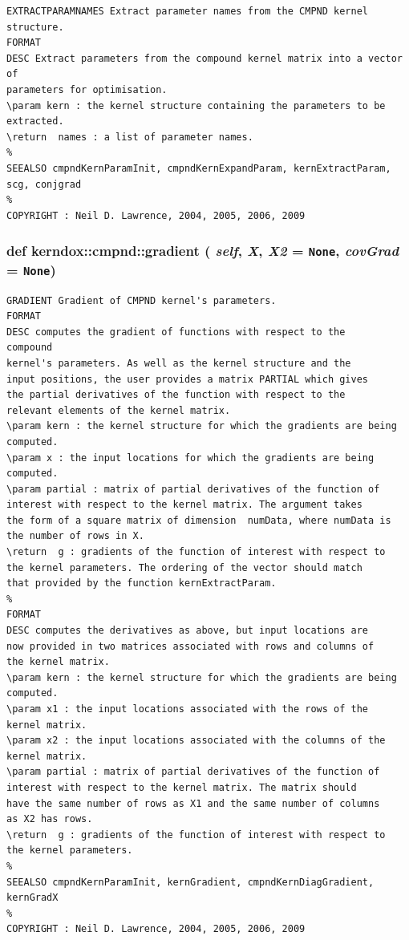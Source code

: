 \footnotesize\begin{verbatim}EXTRACTPARAMNAMES Extract parameter names from the CMPND kernel structure.
FORMAT
DESC Extract parameters from the compound kernel matrix into a vector of
parameters for optimisation.
\param kern : the kernel structure containing the parameters to be
extracted.
\return  names : a list of parameter names.
%
SEEALSO cmpndKernParamInit, cmpndKernExpandParam, kernExtractParam, scg, conjgrad
%
COPYRIGHT : Neil D. Lawrence, 2004, 2005, 2006, 2009

\end{verbatim}
\normalsize
 \hypertarget{classkerndox_1_1cmpnd_029858b6168a89349a61d417ffe99fbd}{
\subsubsection[{gradient}]{\setlength{\rightskip}{0pt plus 5cm}def kerndox::cmpnd::gradient ( {\em self}, \/   {\em X}, \/   {\em X2} = {\tt None}, \/   {\em covGrad} = {\tt None})}}
\label{classkerndox_1_1cmpnd_029858b6168a89349a61d417ffe99fbd}




\footnotesize\begin{verbatim}GRADIENT Gradient of CMPND kernel's parameters.
FORMAT
DESC computes the gradient of functions with respect to the
compound
kernel's parameters. As well as the kernel structure and the
input positions, the user provides a matrix PARTIAL which gives
the partial derivatives of the function with respect to the
relevant elements of the kernel matrix. 
\param kern : the kernel structure for which the gradients are being
computed.
\param x : the input locations for which the gradients are being
computed. 
\param partial : matrix of partial derivatives of the function of
interest with respect to the kernel matrix. The argument takes
the form of a square matrix of dimension  numData, where numData is
the number of rows in X.
\return  g : gradients of the function of interest with respect to
the kernel parameters. The ordering of the vector should match
that provided by the function kernExtractParam.
%
FORMAT
DESC computes the derivatives as above, but input locations are
now provided in two matrices associated with rows and columns of
the kernel matrix. 
\param kern : the kernel structure for which the gradients are being
computed.
\param x1 : the input locations associated with the rows of the
kernel matrix.
\param x2 : the input locations associated with the columns of the
kernel matrix.
\param partial : matrix of partial derivatives of the function of
interest with respect to the kernel matrix. The matrix should
have the same number of rows as X1 and the same number of columns
as X2 has rows.
\return  g : gradients of the function of interest with respect to
the kernel parameters.
%
SEEALSO cmpndKernParamInit, kernGradient, cmpndKernDiagGradient, kernGradX
%
COPYRIGHT : Neil D. Lawrence, 2004, 2005, 2006, 2009

\end{verbatim}
\normalsize
 

